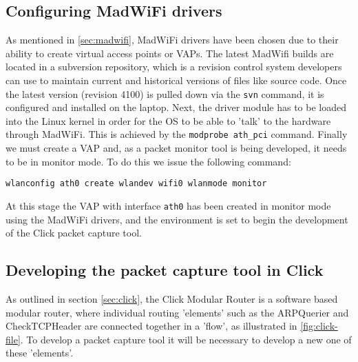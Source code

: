    \subsection{Configuring MadWiFi drivers}

        As mentioned in \ref{sec:madwifi}, MadWiFi drivers have been chosen due to their ability to create virtual access points or VAPs. The latest MadWifi builds are located in a subversion repository\cite{MadSVN}, which is a revision control system developers can use to maintain current and historical versions of files like source code. Once the latest version (revision 4100) is pulled down via the \texttt{svn} command, it is configured and installed on the laptop. Next, the driver module has to be loaded into the Linux kernel in order for the OS to be able to 'talk' to the hardware through MadWiFi. This is achieved by the \texttt{modprobe ath\_pci} command. Finally we must create a VAP and, as a packet monitor tool is being developed, it needs to be in monitor mode. To do this we issue the following command:
	\label{sec:madwifi-conf}
        \begin{center}
        \texttt{wlanconfig ath0 create wlandev wifi0 wlanmode monitor}
        \end{center}
        At this stage the VAP with interface \texttt{ath0} has been created in monitor mode using the MadWiFi drivers, and the environment is set to begin the development of the Click packet capture tool.


    \subsection{Developing the packet capture tool in Click}

        As outlined in section \ref{sec:click}, the Click Modular Router is a software based modular router, where individual routing 'elements' such as the ARPQuerier and CheckTCPHeader are connected together in a 'flow', as illustrated in \ref{fig:click-file}. To develop a packet capture tool it will be necessary to develop a new one of these 'elements'.

